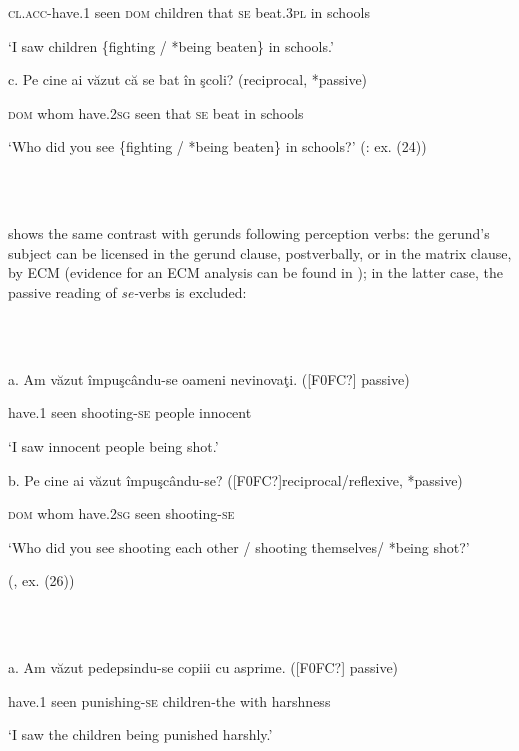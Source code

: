\documentclass[output=paper]{langsci/langscibook}
\begin{document}
      \textsc{cl.acc-}have.1 seen  \textsc{dom} children that \textsc{se} beat.3\textsc{pl} in schools

      ‘I saw children \{fighting / *being beaten\} in schools.’

  c.   Pe    cine     ai            văzut că   se bat  în şcoli?  (reciprocal, *passive)

                 \textsc{dom} whom have.2\textsc{sg} seen that \textsc{se} beat in schools

‘Who did you see \{fighting / *being beaten\} in schools?’ (\citealt{Cornilescu1998}: ex. (24))

\ea%
    \label{ex:key:63}
    \gll\\
        \\
    \glt
    \z

         shows the same contrast with gerunds following perception verbs: the gerund’s subject can be licensed in the gerund clause, postverbally, or in the matrix clause, by ECM (evidence for an ECM analysis can be found in \citealt{Avram2003}); in the latter case, the passive reading of \textit{se-}verbs is excluded:

\ea%
    \label{ex:key:63}
    \gll\\
        \\
    \glt
    \z

          a.   Am    văzut împuşcându-se oameni nevinovaţi. ([F0FC?] passive)  

     have.1 seen   shooting-\textsc{se}      people  innocent

    ‘I saw innocent people being shot.’

  b.   Pe     cine      ai          văzut împuşcându-se? ([F0FC?]reciprocal/reflexive, *passive)

        \textsc{dom} whom have.2\textsc{sg} seen  shooting-\textsc{se}

                  ‘Who did you see shooting each other / shooting themselves/ *being shot?’

    (\citealt{Cornilescu1998}, ex. (26))

\ea%
    \label{ex:key:64}
    \gll\\
        \\
    \glt
    \z

          a.   Am     văzut pedepsindu-se copiii            cu     asprime. ([F0FC?] passive)  

       have.1 seen   punishing-\textsc{se}    children-the with harshness

       ‘I saw the children being punished harshly.’
\end{document}
